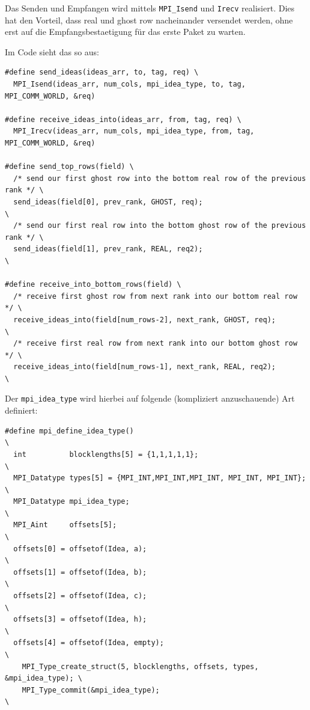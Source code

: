 Das Senden und Empfangen wird mittels \texttt{MPI\_Isend} und
\texttt{Irecv} realisiert. Dies hat den Vorteil, dass real und ghost row
nacheinander versendet werden, ohne erst auf die Empfangsbestaetigung
für das erste Paket zu warten.

Im Code sieht das so aus:

\begin{verbatim}
#define send_ideas(ideas_arr, to, tag, req) \
  MPI_Isend(ideas_arr, num_cols, mpi_idea_type, to, tag, MPI_COMM_WORLD, &req) 

#define receive_ideas_into(ideas_arr, from, tag, req) \
  MPI_Irecv(ideas_arr, num_cols, mpi_idea_type, from, tag, MPI_COMM_WORLD, &req) 

#define send_top_rows(field) \
  /* send our first ghost row into the bottom real row of the previous rank */ \
  send_ideas(field[0], prev_rank, GHOST, req);                                \
  /* send our first real row into the bottom ghost row of the previous rank */ \
  send_ideas(field[1], prev_rank, REAL, req2);                                 \

#define receive_into_bottom_rows(field) \
  /* receive first ghost row from next rank into our bottom real row */ \
  receive_ideas_into(field[num_rows-2], next_rank, GHOST, req);        \
  /* receive first real row from next rank into our bottom ghost row */ \
  receive_ideas_into(field[num_rows-1], next_rank, REAL, req2);         \
\end{verbatim}

Der \texttt{mpi\_idea\_type} wird hierbei auf folgende (kompliziert
anzuschauende) Art definiert:

\begin{verbatim}
#define mpi_define_idea_type()                                               \
  int          blocklengths[5] = {1,1,1,1,1};                                  \
  MPI_Datatype types[5] = {MPI_INT,MPI_INT,MPI_INT, MPI_INT, MPI_INT};       \
  MPI_Datatype mpi_idea_type;                                                \
  MPI_Aint     offsets[5];                                                   \
  offsets[0] = offsetof(Idea, a);                                            \
  offsets[1] = offsetof(Idea, b);                                            \
  offsets[2] = offsetof(Idea, c);                                            \
  offsets[3] = offsetof(Idea, h);                                            \
  offsets[4] = offsetof(Idea, empty);                                        \
    MPI_Type_create_struct(5, blocklengths, offsets, types, &mpi_idea_type); \
    MPI_Type_commit(&mpi_idea_type);                                         \
\end{verbatim}

